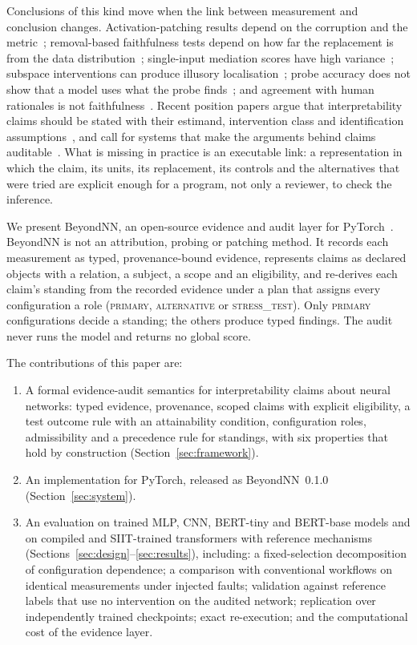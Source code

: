Conclusions of this kind move when the link between measurement and conclusion changes. Activation-patching results depend on the corruption and the metric~\cite{zhang2024patching}; removal-based faithfulness tests depend on how far the replacement is from the data distribution~\cite{hase2021ood,hooker2019roar}; single-input mediation scores have high variance~\cite{meloux2026variance}; subspace interventions can produce illusory localisation~\cite{makelov2024illusion}; probe accuracy does not show that a model uses what the probe finds~\cite{belinkov2022probing,elazar2021amnesic,hewitt2019control}; and agreement with human rationales is not faithfulness~\cite{jacovi2020faithfulness,deyoung2020eraser}. Recent position papers argue that interpretability claims should be stated with their estimand, intervention class and identification assumptions~\cite{joshi2026causality,lin2026identification}, and call for systems that make the arguments behind claims auditable~\cite{lan2026auditable}. What is missing in practice is an executable link: a representation in which the claim, its units, its replacement, its controls and the alternatives that were tried are explicit enough for a program, not only a reviewer, to check the inference.

We present BeyondNN, an open-source evidence and audit layer for PyTorch~\cite{paszke2019pytorch,roufas2026beyondnn}. BeyondNN is not an attribution, probing or patching method. It records each measurement as typed, provenance-bound evidence, represents claims as declared objects with a relation, a subject, a scope and an eligibility, and re-derives each claim's standing from the recorded evidence under a plan that assigns every configuration a role (\textsc{primary}, \textsc{alternative} or \textsc{stress\_test}). Only \textsc{primary} configurations decide a standing; the others produce typed findings. The audit never runs the model and returns no global score.

The contributions of this paper are:
\begin{enumerate}
\item A formal evidence-audit semantics for interpretability claims about neural networks: typed evidence, provenance, scoped claims with explicit eligibility, a test outcome rule with an attainability condition, configuration roles, admissibility and a precedence rule for standings, with six properties that hold by construction (Section~\ref{sec:framework}).
\item An implementation for PyTorch, released as BeyondNN~0.1.0 (Section~\ref{sec:system}).
\item An evaluation on trained MLP, CNN, BERT-tiny and BERT-base models and on compiled and SIIT-trained transformers with reference mechanisms (Sections~\ref{sec:design}--\ref{sec:results}), including: a fixed-selection decomposition of configuration dependence; a comparison with conventional workflows on identical measurements under injected faults; validation against reference labels that use no intervention on the audited network; replication over independently trained checkpoints; exact re-execution; and the computational cost of the evidence layer.
\end{enumerate}

